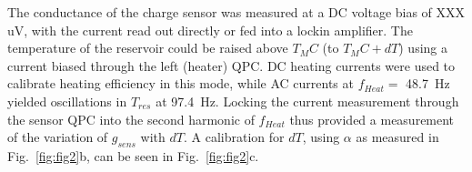 \documentclass[twocolumn,showpacs,preprintnumbers,amsmath,amssymb,pra,aps,superscriptaddress]{revtex4-1}
\begin{document}
The conductance of the charge sensor was measured at a DC voltage bias of XXX uV, with the current read out directly or fed into a lockin amplifier.  The temperature of the reservoir could be raised above $T_MC$ (to $T_MC + dT$) using a current biased through the left (heater) QPC.  DC heating currents were used to calibrate heating efficiency in this mode, while AC currents at $f_{Heat} =$ \SI{48.7}{\hertz} yielded oscillations in $T_{res}$ at \SI{97.4}{\hertz}.  Locking the current measurement through the sensor QPC into the second harmonic of $f_{Heat}$ thus provided a measurement of the variation of $g_{sens}$ with $dT$. A calibration for $dT$, using $\alpha$ as measured in Fig.~\ref{fig:fig2}b, can be seen in Fig.~\ref{fig:fig2}c. 



{}

\end{document}
